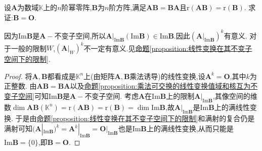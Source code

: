 \documentclass[../../main.tex]{subfiles}%
\begin{document}
\begin{example}
设\(\boldsymbol{A}\)为数域\(\mathbb{K}\)上的\(n\)阶幂零阵,\(\boldsymbol{B}\)为\(n\)阶方阵,满足\(\boldsymbol{A}\boldsymbol{B}=\boldsymbol{B}\boldsymbol{A}\)且\(\text{r}(\boldsymbol{A}\boldsymbol{B})=\text{r}(\boldsymbol{B})\). 求证:\(\boldsymbol{B}=\boldsymbol{O}\).
\end{example}
\begin{remark}
因为$\text{Im}\boldsymbol{B}$是$\boldsymbol{A}-$不变子空间,所以\(\boldsymbol{A}|_{\text{Im}\boldsymbol{B}}(\text{Im}\boldsymbol{B})\in \text{Im}\boldsymbol{B}\).因此$(\boldsymbol{A}|_{\text{Im}\boldsymbol{B}})^k $有意义.
对于一般的限制$W$,$(\boldsymbol{A}|_{W})^k $不一定有意义.见\hyperref[proposition:线性变换在其不变子空间下的限制]{命题\ref{proposition:线性变换在其不变子空间下的限制}}.
\end{remark}
\begin{proof}
将\(\boldsymbol{A},\boldsymbol{B}\)都看成是\(\mathbb{K}^n\)上(由矩阵\(\boldsymbol{A},\boldsymbol{B}\)乘法诱导)的线性变换,设\(\boldsymbol{A}^k = \boldsymbol{O}\),其中\(k\)为正整数. 由\(\boldsymbol{A}\boldsymbol{B}=\boldsymbol{B}\boldsymbol{A}\)以及\hyperref[proposition:乘法可交换的线性变换值域和核互为不变子空间]{命题\ref{proposition:乘法可交换的线性变换值域和核互为不变子空间}}可知\(\text{Im}\boldsymbol{B}\)是\(\boldsymbol{A}-\)不变子空间. 考虑\(\boldsymbol{A}\)在\(\text{Im}\boldsymbol{B}\)上的限制\(\boldsymbol{A}|_{\text{Im}\boldsymbol{B}}\),其像空间的维数\(\dim\boldsymbol{A}\boldsymbol{B}(\mathbb{K}^n)=\text{r}(\boldsymbol{A}\boldsymbol{B})=\text{r}(\boldsymbol{B})=\dim\text{Im}\boldsymbol{B}\),故\(\boldsymbol{A}|_{\text{Im}\boldsymbol{B}}\)是\(\text{Im}\boldsymbol{B}\)上的满线性变换. 于是由\hyperref[proposition:线性变换在其不变子空间下的限制]{命题\ref{proposition:线性变换在其不变子空间下的限制}}和满射的复合仍是满射可知\((\boldsymbol{A}|_{\text{Im}\boldsymbol{B}})^k = \boldsymbol{A}^k|_{\text{Im}\boldsymbol{B}}=\boldsymbol{O}|_{\text{Im}\boldsymbol{B}}\)也是\(\text{Im}\boldsymbol{B}\)上的满线性变换,从而只能是\(\text{Im}\boldsymbol{B}=\{0\}\),即\(\boldsymbol{B}=\boldsymbol{O}\). 
\end{proof}
\end{document}

